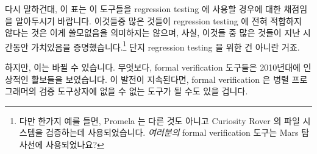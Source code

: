 다시 말하건대, 이 표는 이 도구들을 regression testing 에 사용할 경우에 대한
채점임을 알아두시기 바랍니다.
이것들중 많은 것들이 regression testing 에 전혀 적합하지 않다는 것은 이게
쓸모없음을 의미하지는 않으며, 사실, 이것들 중 많은 것들이 지난 시간동안
가치있음을 증명했습니다.\footnote{
	다만 한가지 예를 들면, Promela 는 다른 것도 아니고 Curiosity Rover 의
	파일 시스템을 검증하는데 사용되었습니다.
	\emph{여러분의} formal verification 도구는 Mars 탐사선에 사용되었나요?}
단지 regression testing 을 위한 건 아니란 거죠.

하지만, 이는 바뀔 수 있습니다.
무엇보다, formal verification 도구들은 2010년대에 인상적인 활보들을 보였습니다.
이 발전이 지속된다면, formal verification 은 병렬 프로그래머의 검증 도구상자에
없을 수 없는 도구가 될 수도 있을 겁니다.
\iffalse

Once again, please note that this table rates these tools for use in
regression testing.
Just because many of them are poor fit for regression testing does
not at all mean that they are useless, in fact,
many of them have proven their worth many times over.\footnote{
	For but one example, Promela was used to verify the file system
	of none other than the Curiosity Rover.
	Was \emph{your} formal verification tool used on a Mars rover?}
Just not for regression testing.

However, this might well change.
After all, formal verification tools made impressive strides in the 2010s.
If that progress continues, formal verification might well become an
indespensible tool in the parallel programmer's validation toolbox.
\fi
